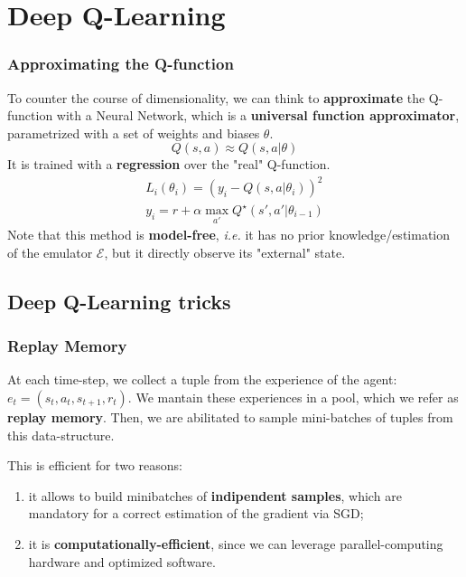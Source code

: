 \documentclass{beamer}
\begin{document}
\section{Deep Q-Learning}
\begin{frame}
	\frametitle{Approximating the Q-function}
	To counter the course of dimensionality, we can think to \textbf{approximate} the Q-function with a Neural Network, which is a \textbf{universal function approximator}, parametrized with a set of weights and biases $\theta$.
	\begin{equation}
		Q(s, a) \approx Q(s,a| \theta)
	\end{equation}
	It is trained with a \textbf{regression} over the "real" Q-function.
		\begin{equation}
\begin{aligned}
L_i(\theta _i ) = (y_i - Q(s,a|\theta_i))^2 \\
y_i =  r + \alpha \max_{a'} Q^\star(s', a'|\theta_{i-1})
\end{aligned}
	\end{equation}
Note that this method is \textbf{model-free}, \textit{i.e.} it has no prior knowledge/estimation of the emulator $\mathcal{E}$, but it directly observe its "external" state.
\end{frame}
\subsection{Deep Q-Learning tricks}

\begin{frame}
\frametitle{Replay Memory}

At each time-step, we collect a tuple from the experience of the agent: $e_t = (s_t, a_t, s_{t+1}, r_t)$. We mantain these experiences in a pool, which we refer as \textbf{replay memory}. Then, we are abilitated to sample mini-batches of tuples from this data-structure.

This is efficient for two reasons: 
\begin{enumerate}
	\item it allows to build minibatches of \textbf{indipendent samples}, which are mandatory for a correct estimation of the gradient via SGD;
	\item it is \textbf{computationally-efficient}, since we can leverage parallel-computing hardware and optimized software.
\end{enumerate}

\end{frame}
\end{document}
